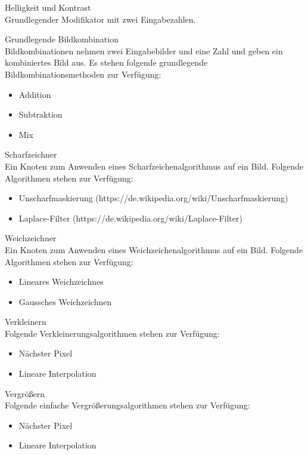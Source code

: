 \begin{speclist}[F]
\setcounter{specnum}{22010}

\item Helligkeit und Kontrast \\
Grundlegender Modifikator mit zwei Eingabezahlen.

\spec Grundlegende Bildkombination \\
Bildkombinationen nehmen zwei Eingabebilder und eine Zahl und geben ein kombiniertes Bild aus. Es stehen folgende grundlegende Bildkombinationsmethoden zur Verfügung:
\begin{itemize}
	\item Addition
	\item Subtraktion
	\item Mix
\end{itemize}

\spec Scharfzeichner \\
Ein Knoten zum Anwenden eines Scharfzeichenalgorithmus auf ein Bild. Folgende Algorithmen stehen zur Verfügung:
\begin{itemize}
	\item Unscharfmaskierung (https://de.wikipedia.org/wiki/Unscharfmaskierung)
	\item Laplace-Filter (https://de.wikipedia.org/wiki/Laplace-Filter)
\end{itemize}

\spec Weichzeichner \\
Ein Knoten zum Anwenden eines Weichzeichenalgorithmus auf ein Bild. Folgende Algorithmen stehen zur Verfügung:
\begin{itemize}
	\item Lineares Weichzeichnes
	\item Gaussches Weichzeichnen
\end{itemize}

\optspec Verkleinern \\
Folgende Verkleinerungsalgorithmen stehen zur Verfügung:
\begin{itemize}
	\item Nächster Pixel
	\item Lineare Interpolation
\end{itemize}

\optspec Vergrößern \\
Folgende einfache Vergrößerungsalgorithmen stehen zur Verfügung:
\begin{itemize}
	\item Nächster Pixel
	\item Lineare Interpolation
\end{itemize}


\end{speclist}
